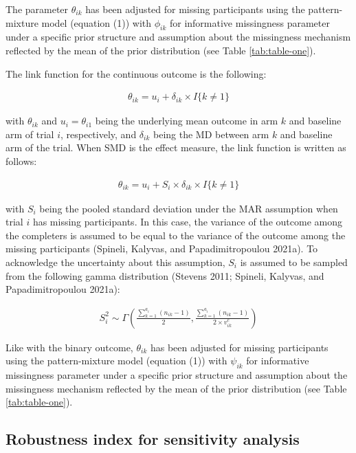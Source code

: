 The parameter \(\theta_{ik}\) has been adjusted for missing participants using the
pattern-mixture model (equation (1)) with \(\phi_{ik}\) for informative
missingness parameter under a specific prior structure and assumption about the
missingness mechanism reflected by the mean of the prior distribution (see Table
\ref{tab:table-one}).

The link function for the continuous outcome is the following:

\[\begin{aligned}
\theta_{ik} = u_{i} + \delta_{ik} \times I\{k \ne 1\}      
\end{aligned}\]

with \(\theta_{ik}\) and \(u_{i} = \theta_{i1}\) being the underlying mean outcome in
arm \(k\) and baseline arm of trial \(i\), respectively, and \(\delta_{ik}\) being the
MD between arm \(k\) and baseline arm of the trial. When SMD is the effect measure,
the link function is written as follows:

\[\begin{aligned}
\theta_{ik} = u_{i} + S_{i} \times \delta_{ik} \times I\{k \ne 1\}      
\end{aligned}\]

with \(S_{i}\) being the pooled standard deviation under the MAR assumption when
trial \(i\) has missing participants. In this case, the variance of the outcome among
the completers is assumed to be equal to the variance of the outcome among the
missing participants (Spineli, Kalyvas, and Papadimitropoulou 2021a). To acknowledge the uncertainty about this
assumption, \(S_{i}\) is assumed to be sampled from the following gamma distribution
(Stevens 2011; Spineli, Kalyvas, and Papadimitropoulou 2021a):

\[\begin{aligned}
S^{2}_{i} \sim \Gamma\left(\frac{\sum_{k=1}^{a_{i}}(n_{ik} - 1)}{2}, \frac{\sum_{k=1}^{a_{i}}(n_{ik} - 1)}{2 \times v^{c}_{ik}}\right)  
\end{aligned}\]

Like with the binary outcome, \(\theta_{ik}\) has been adjusted for missing participants
using the pattern-mixture model (equation (1)) with \(\psi_{ik}\) for informative
missingness parameter under a specific prior structure and assumption about the
missingness mechanism reflected by the mean of the prior distribution (see Table
\ref{tab:table-one}).

\hypertarget{robustness-index-for-sensitivity-analysis}{%
\subsection{Robustness index for sensitivity analysis}\label{robustness-index-for-sensitivity-analysis}}

